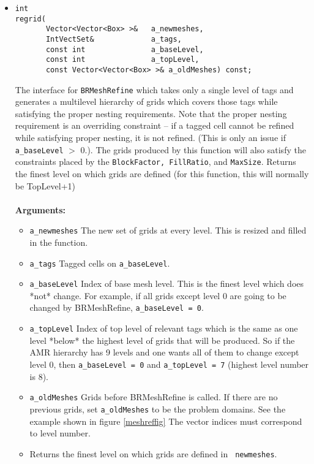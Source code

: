 \begin{itemize}
\item
\begin{verbatim}
int
regrid(
       Vector<Vector<Box> >&   a_newmeshes,
       IntVectSet&             a_tags,
       const int               a_baseLevel,    
       const int               a_topLevel,
       const Vector<Vector<Box> >& a_oldMeshes) const;
\end{verbatim}
The interface for {\tt BRMeshRefine} which takes 
only a single level of tags and generates a multilevel hierarchy of
grids which covers those tags while satisfying the proper nesting
requirements. Note that the proper nesting requirement is an
overriding constraint -- if a tagged cell cannot be refined while
satisfying proper nesting, it is not refined. (This is only an issue
if {\tt a\_baseLevel} $>$ 0.).  The grids produced by this function will also
satisfy the constraints placed by the {\tt BlockFactor, FillRatio}, and
{\tt MaxSize}. Returns the finest level on which grids are defined
(for this function, this will normally be TopLevel+1)\\
\\
{\bf Arguments:} 
\begin{itemize} 
\item  \verb/a_newmeshes/ The new set of grids at every level. This is
resized and filled in the function. 
\item  \verb/a_tags/ Tagged cells on \verb/a_baseLevel/.
\item  \verb/a_baseLevel/ Index of base mesh level.  This is the finest
        level which does *not* change.  For example, if all grids
        except level 0 are going to be changed  by BRMeshRefine,
        \verb/a_baseLevel = 0/.
\item  \verb/a_topLevel/ Index of top level of relevant tags which is the
        same as one level *below* the highest level of grids 
        that will be produced.  So if the AMR hierarchy has 9 levels and
        one wants all of them to change except level 0, then
        \verb/a_baseLevel = 0/ and \verb/a_topLevel = 7/ 
        (highest level number is 8).
\item  \verb/a_oldMeshes/ Grids before BRMeshRefine is called.  If there
        are no previous grids, set \verb/a_oldMeshes/ to be the
        problem domains.  See the example shown in figure
        \ref{meshreffig} 
        The vector indices must correspond to level number.
\item Returns the finest level on which grids are defined in {\tt
newmeshes}.  
\end{itemize}        



\end{itemize}

